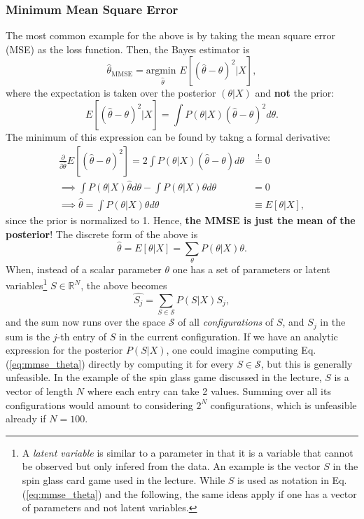 \documentclass{article}
\begin{document}
\subsubsection*{Minimum Mean Square Error}
The most common example for the above is by taking the mean square error (MSE) as the loss function. Then, the Bayes estimator is
\begin{equation}
    \hat{\theta}_{\text{MMSE}} =
    \underset{\hat{\theta}}{\text{argmin }} E\left[(\hat{\theta} - \theta)^2 | X \right],
\end{equation}
where the expectation is taken over the posterior $(\theta | X)$ and \textbf{not} the prior:
\begin{equation}
    E\left[(\hat{\theta} - \theta)^2  | X\right]
    =
    \int P(\theta | X) (\hat{\theta} - \theta)^2 d\theta.
\end{equation}
The minimum of this expression can be found by takng a formal derivative:
\begin{align}
    \frac{\partial}{\partial \hat{\theta}}
    E\left[(\hat{\theta} - \theta)^2 \right]
    = 2\int P(\theta | X) (\hat{\theta} - \theta) d\theta
    &\overset{!}{=} 0 \\
    \implies
    \int  P(\theta | X) \hat{\theta} d\theta
    - \int  P(\theta | X) \theta d\theta &= 0 \\
    \implies
    \hat{\theta} = \int P(\theta | X)\theta d\theta
    &\equiv E\left[ \theta | X\right],
\end{align}
since the prior is normalized to 1. Hence, \textbf{the MMSE is just the mean of the posterior}! The discrete form of the above is
\begin{equation}
    \hat{\theta} = E\left[ \theta | X\right]
    =
    \sum_{\theta} P(\theta | X)\theta.
\end{equation}
When, instead of a scalar parameter $\theta$ one has a set of parameters or latent variables\footnote{A \emph{latent variable} is similar to a parameter in that it is a variable that cannot be observed but only infered from the data. An example is the vector $S$ in the spin glass card game used in the lecture. While $S$ is used as notation in Eq. (\ref{eq:mmse_theta}) and the following, the same ideas apply if one has a vector of parameters and not latent variables.} $S \in \mathbb{R}^N$, the above becomes
\begin{equation}
    \hat{S_j}
    =
    \sum_{S \in \mathcal{S}} P(S | X)S_j,
    \label{eq:mmse_theta}
\end{equation}
and the sum now runs over the space $\mathcal{S}$ of all \emph{configurations} of $S$, and $S_j$ in the sum is the $j$-th entry of $S$ in the current configuration. If we have an analytic expression for the posterior $P(S|X)$, one could imagine computing Eq. (\ref{eq:mmse_theta}) directly by computing it for every $S\in\mathcal{S}$, but this is generally unfeasible. In the example of the spin glass game discussed in the lecture, $S$ is a vector of length $N$ where each entry can take 2 values. Summing over all its configurations would amount to considering $2^N$ configurations, which is unfeasible already if $N=100$.
\end{document}

